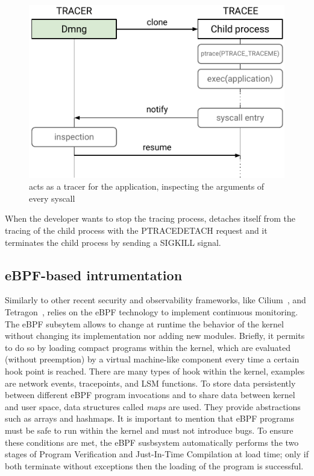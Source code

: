 \begin{figure}[t!]
  \centering
  \includegraphics[width=0.6\columnwidth]{chapters/dmng/fig/ptrace_overview.pdf}
  \caption[Architecture of the ptrace-based instrumentation]{\dmng acts as a
    tracer for the application, inspecting the arguments of every
    syscall}
  \label{fig:ptrace}
\end{figure}

When the developer wants to stop the tracing process, \dmng detaches
itself from the tracing of the child process with the
PTRACE\textunderscore DETACH request and it terminates the child
process by sending a SIGKILL signal.

\subsection{eBPF-based intrumentation}\label{sect:cont-monit}

Similarly to other recent security and observability frameworks, like
Cilium~\cite{cilium-repo}, and Tetragon~\cite{tetragon}, \dmng relies
on the eBPF technology to implement continuous monitoring. The eBPF
subsytem allows to change at runtime the behavior of the kernel
without changing its implementation nor adding new modules. Briefly,
it permits to do so by loading compact programs within the kernel,
which are evaluated (without preemption) by a virtual machine-like
component every time a certain hook point is reached. There are many
types of hook within the kernel, examples are network events,
tracepoints, and LSM functions. To store data persistently between
different eBPF program invocations and to share data between kernel
and user space, data structures called {\em maps} are used. They
provide abstractions such as arrays and hashmaps. It is important to
mention that eBPF programs must be safe to run within the kernel and
must not introduce bugs. To ensure these conditions are met, the eBPF
susbsystem automatically performs the two stages of Program
Verification and Just-In-Time Compilation at load time; only if both
terminate without exceptions then the loading of the program is successful.

